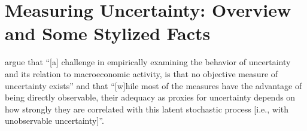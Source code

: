\documentclass[a4paper,11pt,listof=nochaptergap,oneside,pointednumbers,bibtotoc,bigheadings,liststotoc,hidelinks]{scrbook}
\theoremstyle{mysatz}
\theoremstyle{mydefinition}
\theoremstyle{mytheorem}
\theoremstyle{mybemerkung}
\begin{document}






\section{Measuring Uncertainty: Overview and Some Stylized Facts}
\label{sec:uncertaintymeasuresandstylizedfacts}

\citet[p. 1178]{juradoetal:15} argue that ``[a] challenge in empirically examining the behavior of uncertainty and its relation to macroeconomic activity, is that no objective measure of uncertainty exists'' and that ``[w]hile most of the measures have the advantage of being directly observable, their adequacy as proxies for uncertainty depends on how strongly they are correlated with this latent stochastic process [i.e., with unobservable uncertainty]''.
\end{document}

